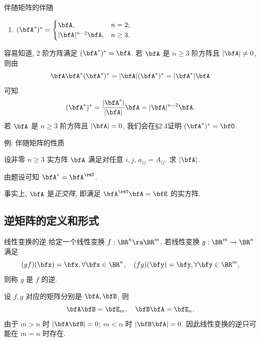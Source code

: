 \begin{frame}{伴随矩阵的伴随}
	\onslide<+->
	\begin{enumerate}\bf
		\setcounter{enumi}{4}
		\item $(\bfA^*)^*=\begin{cases}
			\bfA,&n=2;\\
			|\bfA|^{n-2}\bfA,&n\ge3.
		\end{cases}$
	\end{enumerate}


	\onslide<+->
	容易知道, $2$ 阶方阵满足 $(\bfA^*)^*=\bfA$.
	\onslide<+->
	若 $\bfA$ 是 $n\ge3$ 阶方阵且 $|\bfA|\neq 0$, 则由
	\[\bfA\bfA^*(\bfA^*)^*=|\bfA|(\bfA^*)^*=|\bfA^*|\bfA\]
	可知
	\[(\bfA^*)^*=\frac{|\bfA^*|}{|\bfA|}\bfA=|\bfA|^{n-2}\bfA.\]
	\onslide<+->
	若 $\bfA$ 是 $n\ge3$ 阶方阵且 $|\bfA|=0$, 我们会在\S2.4证明 $(\bfA^*)^*=\bfO$.
\end{frame}


\begin{frame}{例: 伴随矩阵的性质}
	\onslide<+->
	\begin{example}
		设非零 $n\ge 3$ 实方阵 $\bfA$ 满足对任意 $i,j$, $a_{ij}=A_{ij}$. 求 $|\bfA|$.
	\end{example}
	\onslide<+->
	\begin{solution}
		由题设可知 $\bfA^*=\bfA^\rmT$.
		\onslide<+->{%
			因此 $|\bfA|=|\bfA^*|=|\bfA|^{n-1}$, $|\bfA|=0,1$ 或 $-1$.
		}

	\end{solution}
	\onslide<+->
	事实上, $\bfA$ 是\emph{正交阵}, 即满足 $\bfA^\rmT\bfA=\bfE$ 的实方阵.
\end{frame}



\subsection{逆矩阵的定义和形式}
\begin{frame}{线性变换的逆\noexer}
	\onslide<+->
	给定一个线性变换 $f:\BR^n\ra\BR^m$, 若线性变换 $g:\BR^m\to\BR^n$ 满足
	\[(gf)(\bfx)=\bfx,\forall \bfx\in\BR^n,\quad
	(fg)(\bfy)=\bfy,\forall \bfy\in\BR^m,\]
	\onslide<+->
	则称 $g$ 是 $f$ 的逆.

	\onslide<+->
	设 $f,g$ 对应的矩阵分别是 $\bfA,\bfB$, 则
	\[\bfA\bfB=\bfE_m,\quad \bfB\bfA=\bfE_n.\]
	\onslide<+->
	由于 $m>n$ 时 $|\bfA\bfB|=0$; $m<n$ 时 $|\bfB\bfA|=0$.
	\onslide<+->
	因此线性变换的逆只可能在 $m=n$ 时存在.
\end{frame}


